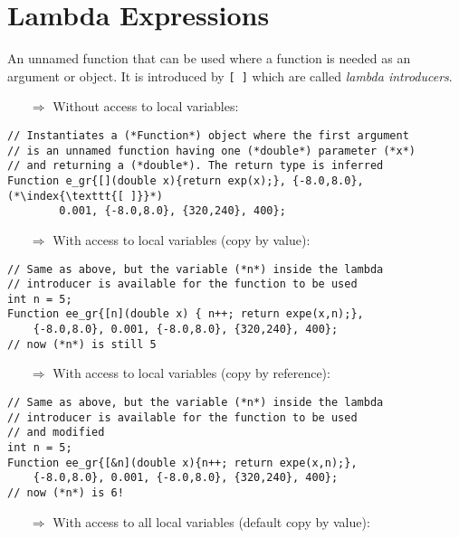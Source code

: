 \documentclass[10pt]{book}
\begin{document}
\section{Lambda Expressions}
An unnamed function that can be used where a function is needed as an argument or object.
It is introduced by \texttt{[ ]} which are called \emph{lambda introducers}.
\begin{enumerate}
\item[$\Rightarrow$] Without access to local variables:
\end{enumerate}
\begin{lstlisting}
// Instantiates a (*Function*) object where the first argument
// is an unnamed function having one (*double*) parameter (*x*)
// and returning a (*double*). The return type is inferred
Function e_gr{[](double x){return exp(x);}, {-8.0,8.0},(*\index{\texttt{[ ]}}*)
        0.001, {-8.0,8.0}, {320,240}, 400};
\end{lstlisting}
\begin{enumerate}
\item[$\Rightarrow$] With access to local variables (copy by value):
\end{enumerate}
\begin{lstlisting}
// Same as above, but the variable (*n*) inside the lambda
// introducer is available for the function to be used
int n = 5;
Function ee_gr{[n](double x) { n++; return expe(x,n);},
    {-8.0,8.0}, 0.001, {-8.0,8.0}, {320,240}, 400};
// now (*n*) is still 5
\end{lstlisting}
\begin{enumerate}
\item[$\Rightarrow$] With access to local variables (copy by reference):
\end{enumerate}
\begin{lstlisting}
// Same as above, but the variable (*n*) inside the lambda
// introducer is available for the function to be used 
// and modified
int n = 5;
Function ee_gr{[&n](double x){n++; return expe(x,n);},
    {-8.0,8.0}, 0.001, {-8.0,8.0}, {320,240}, 400};
// now (*n*) is 6!
\end{lstlisting}
\begin{enumerate}
\item[$\Rightarrow$] With access to all local variables (default copy by value):
\end{enumerate}
\end{document}
